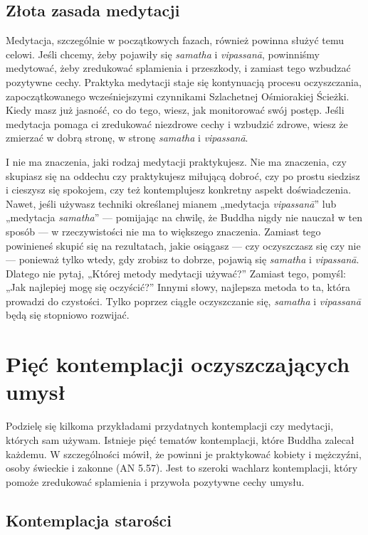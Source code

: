 \documentclass[12pt,openany]{book}
\begin{document}
\section*{Złota zasada medytacji}

Medytacja, szczególnie w początkowych fazach, również powinna służyć temu celowi. Jeśli chcemy, żeby pojawiły się \textit{samatha} i \textit{vipassanā}, powinniśmy medytować, żeby zredukować splamienia i przeszkody, i zamiast tego wzbudzać pozytywne cechy. Praktyka medytacji staje się kontynuacją procesu oczyszczania, zapoczątkowanego wcześniejszymi czynnikami Szlachetnej Ośmiorakiej Ścieżki. Kiedy masz już jasność, co do tego, wiesz, jak monitorować swój postęp. Jeśli medytacja pomaga ci zredukować niezdrowe cechy i wzbudzić zdrowe, wiesz że zmierzać w dobrą stronę, w stronę \textit{samatha} i \textit{vipassanā}.

I nie ma znaczenia, jaki rodzaj medytacji praktykujesz. Nie ma znaczenia, czy skupiasz się na oddechu czy praktykujesz miłującą dobroć, czy po prostu siedzisz i cieszysz się spokojem, czy też kontemplujesz konkretny aspekt doświadczenia. Nawet, jeśli używasz techniki określanej mianem „medytacja \textit{vipassanā}” lub „medytacja \textit{samatha}” --- pomijając na chwilę, że Buddha nigdy nie nauczał w ten sposób --- w rzeczywistości nie ma to większego znaczenia. Zamiast tego powinieneś skupić się na rezultatach, jakie osiągasz --- czy oczyszczasz się czy nie --- ponieważ tylko wtedy, gdy zrobisz to dobrze, pojawią się \textit{samatha} i \textit{vipassanā}. Dlatego nie pytaj, „Której metody medytacji używać?” Zamiast tego, pomyśl: „Jak najlepiej mogę się oczyścić?” Innymi słowy, najlepsza metoda to ta, która prowadzi do czystości. Tylko poprzez ciągłe oczyszczanie się, \textit{samatha} i \textit{vipassanā} będą się stopniowo rozwijać.

\chapter*{Pięć kontemplacji oczyszczających umysł}

Podzielę się kilkoma przykładami przydatnych kontemplacji czy medytacji, których sam używam. Istnieje pięć tematów kontemplacji, które Buddha zalecał każdemu. W szczególności mówił, że powinni je praktykować kobiety i mężczyźni, osoby świeckie i zakonne (AN 5.57). Jest to szeroki wachlarz kontemplacji, który pomoże zredukować splamienia i przywoła pozytywne cechy umysłu.

\section*{Kontemplacja starości}
\end{document}
